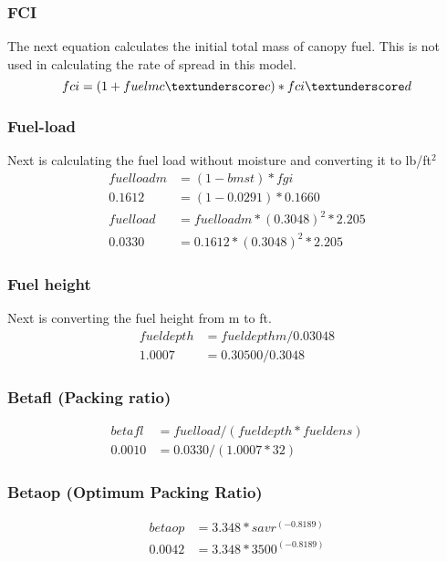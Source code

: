 \documentclass{article}
\begin{document}
\subsubsection*{FCI}
	The next equation calculates the initial total mass of canopy fuel. This is not used in calculating the rate of spread in this model. 
\begin{equation}
	\label{fci}
	fci = (1 + fuelmc \textunderscore c) * fci \textunderscore d
\end{equation}
\subsubsection*{Fuel-load}
Next is calculating the fuel load without moisture and converting it to lb/ft$^2$
\begin{equation}
	\label{fuelloadm}
	\begin{split}
		fuelloadm &= (1 - bmst) * fgi \\
		0.1612 &= (1 - 0.0291) * 0.1660 \\
		fuelload &= fuelloadm * (0.3048)^2 * 2.205 \\
		0.0330 &= 0.1612 * (0.3048) ^ 2 * 2.205
	\end{split}
\end{equation}
\subsubsection*{Fuel height}
Next is converting the fuel height from m to ft. 
\begin{equation}
	\label{fuel_depth_m}
	\begin{split}
		fueldepth &= fueldepthm / 0.03048 \\
		1.0007 &= 0.30500 / 0.3048
	\end{split}
\end{equation}
\subsubsection*{Betafl (Packing ratio)}
\begin{equation}
	\begin{split}
		betafl &= fuelload/(fueldepth * fueldens) \\
		0.0010 &= 0.0330 / (1.0007 * 32)
	\end{split}
\end{equation}

\subsubsection*{Betaop (Optimum Packing Ratio)}
\begin{equation}
\label{betafl_WRF}
	\begin{split}
		betaop &= 3.348 * savr^{(-0.8189)} \\
		0.0042 &= 3.348 * 3500 ^ {(-0.8189)}
	\end{split}
\end{equation}
\end{document}
